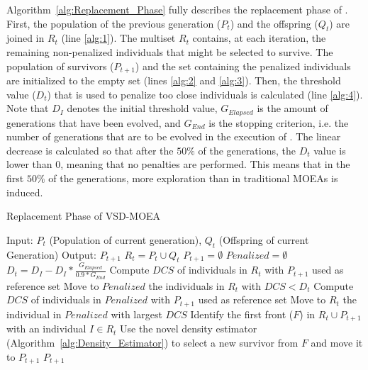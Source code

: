 Algorithm~\ref{alg:Replacement_Phase} fully describes the replacement phase of \VSDMOEA{}.
%
First, the population of the previous generation ($P_t$) and the offspring ($Q_t$) are joined
in $R_t$ (line \ref{alg:1}).
%
The multiset $R_t$ contains, at each iteration, the remaining non-penalized individuals that might be selected 
to survive.
%
The population of survivors ($P_{t+1}$) and the set containing the penalized individuals are initialized to
the empty set (lines \ref{alg:2} and \ref{alg:3}).
%
Then, the threshold value ($D_t$) that is used to penalize too close individuals is calculated (line \ref{alg:4}).
%
Note that $D_I$ denotes the initial threshold value, $G_{Elapsed}$ is the amount of generations that have 
been evolved, and $G_{End}$ is the stopping criterion, i.e. the number of generations that are to be evolved 
in the execution of \VSDMOEA{}.
%
The linear decrease is calculated so that after the $50\%$ of the generations, the $D_t$ value is lower than 0, 
meaning that no penalties are performed.
%
This means that in the first $50\%$ of the generations, more exploration than in traditional MOEAs is induced.
%

\begin{algorithm}[t]
	\caption{Replacement Phase of VSD-MOEA} 
\begin{small}
\begin{algorithmic}[1]
\STATE Input: $P_t$ (Population of current generation), $Q_t$ (Offspring of current Generation)
    	\STATE Output: $P_{t+1}$ 
        \STATE $R_t = P_t \cup Q_t$ \label{alg:1}
        \STATE $P_{t+1} = \emptyset$ \label{alg:2}
        \STATE $Penalized = \emptyset$ \label{alg:3}
				\STATE $D_t = D_I - D_I * \frac{G_{Elapsed}}{0.9*G_{End}}$ \label{alg:4}
         \label{alg:6}
					\STATE Compute $DCS$ of individuals in $R_t$ with $P_{t+1}$ used as reference set \label{alg:7}
					\STATE Move to $Penalized$ the individuals in $R_t$ with $DCS < D_t$  \label{alg:8}
        	 \label{alg:9}
						\STATE Compute $DCS$ of individuals in $Penalized$ with $P_{t+1}$ used as reference set \label{alg:10}
						\STATE Move to $R_t$ the individual in $Penalized$ with largest $DCS$ \label{alg:11}
        	\ENDIF
					\STATE Identify the first front ($F$) in $R_t \cup P_{t+1}$ with an individual $I \in R_t$ \label{alg:12}
					\STATE Use the novel density estimator (Algorithm~\ref{alg:Density_Estimator}) to select a new survivor 
					from $F$ and move it to $P_{t+1}$\label{alg:13}
        \ENDWHILE
    	\RETURN $P_{t+1}$ \label{alg:14}
	\end{algorithmic}
\end{small}
\label{alg:Replacement_Phase}
\end{algorithm}

